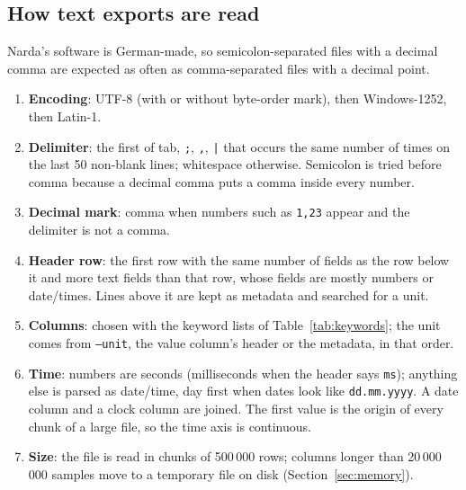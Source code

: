 \documentclass[10pt,letterpaper]{article}
\numberwithin{equation}{section}
\begin{document}
\subsection{How text exports are read}\label{sec:textreading}
Narda's software is German-made, so semicolon-separated files with a decimal
comma are expected as often as comma-separated files with a decimal point.
\begin{enumerate}
\item \textbf{Encoding}: UTF-8 (with or without byte-order mark), then
Windows-1252, then Latin-1.
\item \textbf{Delimiter}: the first of tab, \texttt{;}, \texttt{,}, \texttt{|}
that occurs the same number of times on the last 50 non-blank lines;
whitespace otherwise. Semicolon is tried before comma because a decimal comma
puts a comma inside every number.
\item \textbf{Decimal mark}: comma when numbers such as \texttt{1,23} appear
and the delimiter is not a comma.
\item \textbf{Header row}: the first row with the same number of fields as the
row below it and more text fields than that row, whose fields are mostly
numbers or date/times. Lines above it are kept as metadata and searched for a
unit.
\item \textbf{Columns}: chosen with the keyword lists of Table~\ref{tab:keywords};
the unit comes from \texttt{--unit}, the value column's header or the
metadata, in that order.
\item \textbf{Time}: numbers are seconds (milliseconds when the header says
\texttt{ms}); anything else is parsed as date/time, day first when dates look
like \texttt{dd.mm.yyyy}. A date column and a clock column are joined. The
first value is the origin of every chunk of a large file, so the time axis is
continuous.
\item \textbf{Size}: the file is read in chunks of 500\,000 rows; columns longer
than 20\,000\,000 samples move to a temporary file on disk (Section~\ref{sec:memory}).
\end{enumerate}
\end{document}
